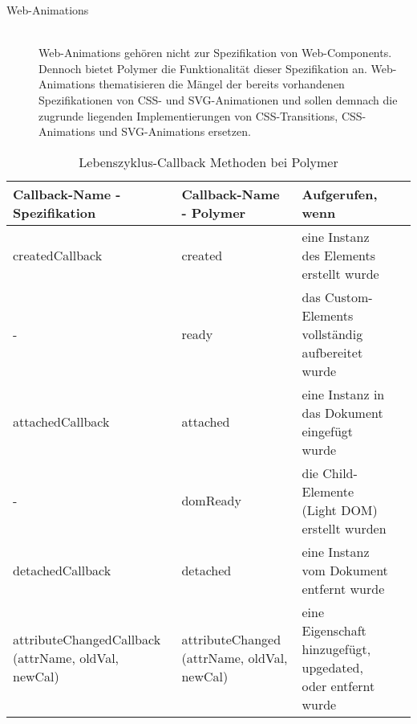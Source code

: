 \begin{description}
\item[Web-Animations] \hfill \\
Web-Animations gehören nicht zur Spezifikation von Web-Components. Dennoch bietet Polymer die Funktionalität dieser Spezifikation an. Web-Animations thematisieren die Mängel der bereits vorhandenen Spezifikationen von CSS- und SVG-Animationen und sollen demnach die zugrunde liegenden Implementierungen von CSS-Transitions, CSS-Animations und SVG-Animations ersetzen.


\end{description}


\begin{table}[htbp]
\centering
\begin{tabular}{ M{4cm} | M{4cm} | M{4cm} N}
Callback-Name - Spezifikation & Callback-Name - Polymer &Aufgerufen, wenn &\\[4ex]
\hline
\hline
createdCallback & created & eine Instanz des Elements erstellt wurde&\\[4ex]
\hline
- & ready & das Custom-Elements vollständig aufbereitet wurde&\\[4ex]
\hline
attachedCallback & attached & eine Instanz in das Dokument eingefügt wurde&\\[4ex]
\hline
- & domReady & die Child-Elemente (Light DOM) erstellt wurden&\\[4ex]
\hline
detachedCallback & detached & eine Instanz vom Dokument entfernt wurde&\\[4ex]
\hline
attributeChangedCallback (attrName, oldVal, newCal) & attributeChanged (attrName, oldVal, newCal) & eine Eigenschaft hinzugefügt, upgedated, oder entfernt wurde&\\[4ex]
\end{tabular}
\caption[
Lebenszyklus-Callback Methoden bei Polymer
]
{Lebenszyklus-Callback Methoden bei Polymer}
\label{tab:Lifecycle_Callback_Methoden_Polymer2}
\end{table}

